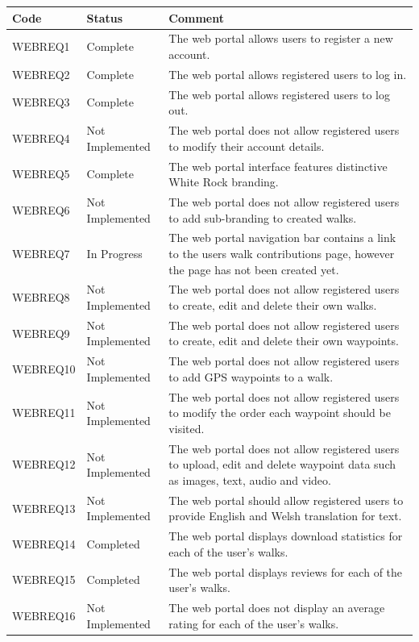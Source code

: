 \documentclass[11pt,a4paper]{article}
\begin{document}
\begin{longtable}{ p{}|p{}|p{} }
\textbf{Code} & \textbf{Status} & \textbf{Comment} \\
\hline
WEBREQ1 & Complete & The web portal allows users to register a new account. \\ \hline
WEBREQ2 & Complete & The web portal allows registered users to log in. \\ \hline
WEBREQ3 & Complete & The web portal allows registered users to log out. \\ \hline
WEBREQ4 & Not Implemented & The web portal does not allow registered users to modify their account details. \\ \hline
WEBREQ5 & Complete & The web portal interface features distinctive White Rock branding. \\ \hline
WEBREQ6 & Not Implemented & The web portal does not allow registered users to add sub-branding to created walks. \\ \hline
WEBREQ7 & In Progress & The web portal navigation bar contains a link to the users walk contributions page, however the page has not been created yet. \\ \hline
WEBREQ8 & Not Implemented & The web portal does not allow registered users to create, edit and delete their own walks. \\ \hline
WEBREQ9 & Not Implemented & The web portal does not allow registered users to create, edit and delete their own waypoints. \\ \hline
WEBREQ10 & Not Implemented & The web portal does not allow registered users to add GPS waypoints to a walk. \\ \hline
WEBREQ11 & Not Implemented & The web portal does not allow registered users to modify the order each waypoint should be visited. \\ \hline
WEBREQ12 & Not Implemented & The web portal does not allow registered users to upload, edit and delete waypoint data such as images, text, audio and video. \\ \hline
WEBREQ13 & Not Implemented & The web portal should allow registered users to provide English and Welsh translation for text. \\ \hline
WEBREQ14 & Completed & The web portal displays download statistics for each of the user's walks. \\ \hline
WEBREQ15 & Completed & The web portal displays reviews for each of the user's walks. \\ \hline
WEBREQ16 & Not Implemented & The web portal does not display an average rating for each of the user's walks. \\ \hline

\end{longtable}
\end{document}
